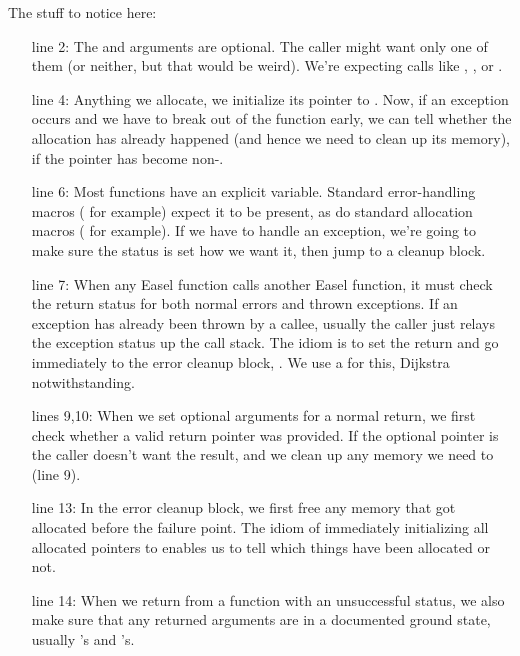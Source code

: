 The stuff to notice here:

\begin{itemize}
\item[line 2:] The  and  arguments
  are optional. The caller might want only one of them (or neither,
  but that would be weird). We're expecting calls like
  ,
  , or
  .

\item[line 4:] Anything we allocate, we initialize its pointer to . 
  Now, if an exception occurs and we have to break out of the function early,
  we can tell whether the allocation has already happened (and hence we need
  to clean up its memory), if the pointer has become non-.

\item[line 6:] Most functions have an explicit  variable.
  Standard error-handling macros ( for example) expect it to be present,
  as do standard allocation macros ( for example).
  If we have to handle an exception, we're going to make sure the status
  is set how we want it, then jump to a cleanup block.

\item[line 7:] When any Easel function calls another Easel function,
  it must check the return status for both normal errors and thrown
  exceptions. If an exception has already been thrown by a callee,
  usually the caller just relays the exception status up the call
  stack. The idiom is to set the return  and go
  immediately to the error cleanup block, . We use a
   for this, Dijkstra notwithstanding.

\item[lines 9,10:] When we set optional arguments for a normal return,
  we first check whether a valid return pointer was provided. If the
  optional pointer is  the caller doesn't want the result,
  and we clean up any memory we need to (line 9).

\item[line 13:] In the error cleanup block, we first free any memory
  that got allocated before the failure point. The idiom of
  immediately initializing all allocated pointers to  
  enables us to tell which things have been allocated or not.

\item[line 14:] When we return from a function with an unsuccessful 
  status, we also make sure that any returned arguments are in 
  a documented ground state, usually 's and 's.
\end{itemize}


